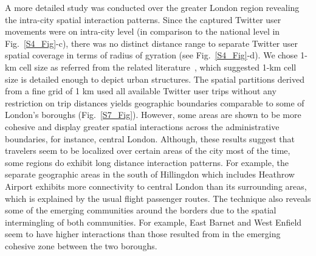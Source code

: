 \documentclass[]{tGIS2e}
\begin{document}
A more detailed study was conducted over the greater London region revealing the intra-city spatial interaction patterns.
Since the captured Twitter user movements were on intra-city level (in comparison to the national level in Fig.~\ref{S4_Fig}-c), there was no distinct distance range to separate Twitter user spatial coverage in terms of radius of gyration (see Fig.~\ref{S4_Fig}-d). 
We chose 1-km cell size as referred from the related literature~\citep{liu2015}, which suggested 1-km cell size is detailed enough to depict urban structures.
The spatial partitions derived from a fine grid of 1 km used all available Twitter user trips without any restriction on trip distances yields geographic boundaries comparable to some of London's boroughs  (Fig.~\ref{S7_Fig}).
However, some areas are shown to be more cohesive and display greater spatial interactions across the administrative boundaries, for instance, central London.
Although, these results suggest that travelers seem to be localized over certain areas of the city most of the time, some regions do exhibit long distance interaction patterns.
For example, the separate geographic areas in the south of Hillingdon which includes Heathrow Airport exhibits more connectivity to central London than its surrounding areas, which is explained by the usual flight passenger routes.
The technique also reveals some of the emerging communities around the borders due to the spatial intermingling of both communities.
For example, East Barnet and West Enfield seem to have higher interactions than those resulted from in the emerging cohesive zone between the two boroughs.
\end{document}
